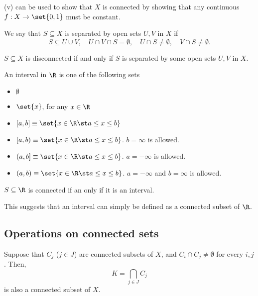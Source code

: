 (v) can be used to show that $X$ is connected by showing that any continuous $f: X \to \set{0,1}$ must be constant.

\begin{ndfn}
  We say that $S \subseteq X$ is separated by open sets $U, V$ in $X$ if
  \begin{equation*}
    S \subseteq U \cup V,
    \quad U \cap V \cap S = \emptyset,
    \quad U \cap S \neq \emptyset,
    \quad V \cap S \neq \emptyset.
  \end{equation*}
\end{ndfn}

\begin{nprop}
  $S \subseteq X$ is disconnected if and only if $S$ is separated by some open sets $U, V$ in $X$.
\end{nprop}

An interval in $\R$ is one of the following sets
\begin{itemize}
\item $\emptyset$
\item $\set{x}$, for any $x \in \R$
\item $[a,b] \equiv \set{x \in \R \st a \leq x \leq b}$
\item $[a,b) \equiv \set{x \in \R \st a \leq x \leq b}$. $b=\infty$ is allowed.
\item $(a,b] \equiv \set{x \in \R \st a \leq x \leq b}$. $a=-\infty$ is allowed.
\item $(a,b) \equiv \set{x \in \R \st a \leq x \leq b}$. $a=-\infty$ and $b=\infty$ is allowed.
\end{itemize}

\begin{nlemma}
  $S \subseteq \R$ is connected if an only if it is an interval.
\end{nlemma}
This suggests that an interval can simply be defined as a connected subset of $\R$.

\subsection{Operations on connected sets}
\begin{nprop}\label{thm:connected-check-a}
  Suppose that $C_j$ ($j \in J$) are connected subsets of $X$, and $C_i \cap C_j \neq \emptyset$ for every $i,j$. Then,
  \begin{equation*}
    K = \bigcap_{j \in J} C_j
  \end{equation*}
  is also a connected subset of $X$.
\end{nprop}

